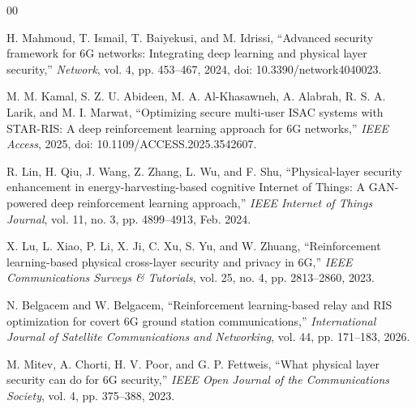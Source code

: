 \documentclass[conference]{IEEEtran}
\begin{document}
\begin{thebibliography}{00}

 H. Mahmoud, T. Ismail, T. Baiyekusi, and M. Idrissi, ``Advanced security framework for 6G networks: Integrating deep learning and physical layer security,'' \textit{Network}, vol. 4, pp. 453--467, 2024, doi: 10.3390/network4040023.

 M. M. Kamal, S. Z. U. Abideen, M. A. Al-Khasawneh, A. Alabrah, R. S. A. Larik, and M. I. Marwat, ``Optimizing secure multi-user ISAC systems with STAR-RIS: A deep reinforcement learning approach for 6G networks,'' \textit{IEEE Access}, 2025, doi: 10.1109/ACCESS.2025.3542607.

 R. Lin, H. Qiu, J. Wang, Z. Zhang, L. Wu, and F. Shu, ``Physical-layer security enhancement in energy-harvesting-based cognitive Internet of Things: A GAN-powered deep reinforcement learning approach,'' \textit{IEEE Internet of Things Journal}, vol. 11, no. 3, pp. 4899--4913, Feb. 2024.

 X. Lu, L. Xiao, P. Li, X. Ji, C. Xu, S. Yu, and W. Zhuang, ``Reinforcement learning-based physical cross-layer security and privacy in 6G,'' \textit{IEEE Communications Surveys \& Tutorials}, vol. 25, no. 4, pp. 2813--2860, 2023.

 N. Belgacem and W. Belgacem, ``Reinforcement learning-based relay and RIS optimization for covert 6G ground station communications,'' \textit{International Journal of Satellite Communications and Networking}, vol. 44, pp. 171--183, 2026.

 M. Mitev, A. Chorti, H. V. Poor, and G. P. Fettweis, ``What physical layer security can do for 6G security,'' \textit{IEEE Open Journal of the Communications Society}, vol. 4, pp. 375--388, 2023.

\end{thebibliography}
\end{document}
